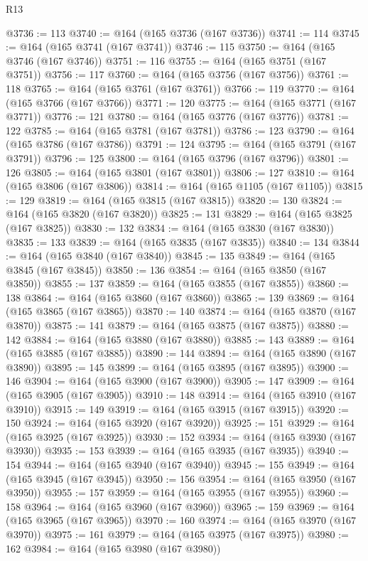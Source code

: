\begin{lexlean}{R13}
\begin{coremodule}
@3736 := 113
@3740 := @164 (@165 @3736 (@167 @3736))
@3741 := 114
@3745 := @164 (@165 @3741 (@167 @3741))
@3746 := 115
@3750 := @164 (@165 @3746 (@167 @3746))
@3751 := 116
@3755 := @164 (@165 @3751 (@167 @3751))
@3756 := 117
@3760 := @164 (@165 @3756 (@167 @3756))
@3761 := 118
@3765 := @164 (@165 @3761 (@167 @3761))
@3766 := 119
@3770 := @164 (@165 @3766 (@167 @3766))
@3771 := 120
@3775 := @164 (@165 @3771 (@167 @3771))
@3776 := 121
@3780 := @164 (@165 @3776 (@167 @3776))
@3781 := 122
@3785 := @164 (@165 @3781 (@167 @3781))
@3786 := 123
@3790 := @164 (@165 @3786 (@167 @3786))
@3791 := 124
@3795 := @164 (@165 @3791 (@167 @3791))
@3796 := 125
@3800 := @164 (@165 @3796 (@167 @3796))
@3801 := 126
@3805 := @164 (@165 @3801 (@167 @3801))
@3806 := 127
@3810 := @164 (@165 @3806 (@167 @3806))
@3814 := @164 (@165 @1105 (@167 @1105))
@3815 := 129
@3819 := @164 (@165 @3815 (@167 @3815))
@3820 := 130
@3824 := @164 (@165 @3820 (@167 @3820))
@3825 := 131
@3829 := @164 (@165 @3825 (@167 @3825))
@3830 := 132
@3834 := @164 (@165 @3830 (@167 @3830))
@3835 := 133
@3839 := @164 (@165 @3835 (@167 @3835))
@3840 := 134
@3844 := @164 (@165 @3840 (@167 @3840))
@3845 := 135
@3849 := @164 (@165 @3845 (@167 @3845))
@3850 := 136
@3854 := @164 (@165 @3850 (@167 @3850))
@3855 := 137
@3859 := @164 (@165 @3855 (@167 @3855))
@3860 := 138
@3864 := @164 (@165 @3860 (@167 @3860))
@3865 := 139
@3869 := @164 (@165 @3865 (@167 @3865))
@3870 := 140
@3874 := @164 (@165 @3870 (@167 @3870))
@3875 := 141
@3879 := @164 (@165 @3875 (@167 @3875))
@3880 := 142
@3884 := @164 (@165 @3880 (@167 @3880))
@3885 := 143
@3889 := @164 (@165 @3885 (@167 @3885))
@3890 := 144
@3894 := @164 (@165 @3890 (@167 @3890))
@3895 := 145
@3899 := @164 (@165 @3895 (@167 @3895))
@3900 := 146
@3904 := @164 (@165 @3900 (@167 @3900))
@3905 := 147
@3909 := @164 (@165 @3905 (@167 @3905))
@3910 := 148
@3914 := @164 (@165 @3910 (@167 @3910))
@3915 := 149
@3919 := @164 (@165 @3915 (@167 @3915))
@3920 := 150
@3924 := @164 (@165 @3920 (@167 @3920))
@3925 := 151
@3929 := @164 (@165 @3925 (@167 @3925))
@3930 := 152
@3934 := @164 (@165 @3930 (@167 @3930))
@3935 := 153
@3939 := @164 (@165 @3935 (@167 @3935))
@3940 := 154
@3944 := @164 (@165 @3940 (@167 @3940))
@3945 := 155
@3949 := @164 (@165 @3945 (@167 @3945))
@3950 := 156
@3954 := @164 (@165 @3950 (@167 @3950))
@3955 := 157
@3959 := @164 (@165 @3955 (@167 @3955))
@3960 := 158
@3964 := @164 (@165 @3960 (@167 @3960))
@3965 := 159
@3969 := @164 (@165 @3965 (@167 @3965))
@3970 := 160
@3974 := @164 (@165 @3970 (@167 @3970))
@3975 := 161
@3979 := @164 (@165 @3975 (@167 @3975))
@3980 := 162
@3984 := @164 (@165 @3980 (@167 @3980))

\end{coremodule}
\end{lexlean}
